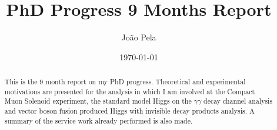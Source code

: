 \documentclass[%
reprint,
amsmath,
amssymb,
aps,
pra,
showkeys
]{revtex4-1}
\begin{document}

\title{PhD Progress 9 Months Report}


\author{João Pela}


\date{\today}

\begin{abstract}
This is the 9 month report on my PhD progress. Theoretical and experimental motivations are presented for the analysis
in which I am involved at the Compact Muon Solenoid experiment, the standard model Higgs on the $\gamma\gamma$ decay 
channel analysis and vector boson fusion produced Higgs with invisible decay products analysis. A summary of the 
service work already performed is also made.
\end{abstract}


\maketitle
\end{document}
